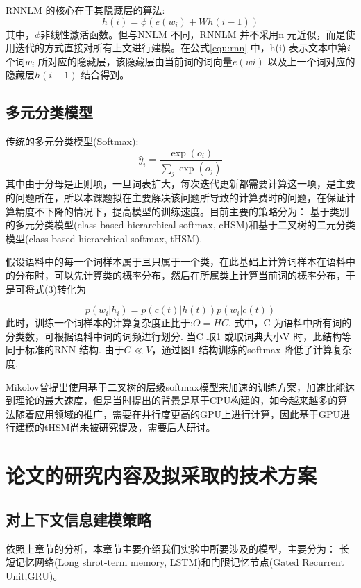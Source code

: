 \documentclass[12pt,a4paper]{article}
\begin{document}
RNNLM 的核心在于其隐藏层的算法:
\begin{equation}
\label{equ:rnn}
h(i) =\phi(e(w_i) +Wh(i -1))
\end{equation}
其中，$\phi$非线性激活函数。但与NNLM 不同，RNNLM 并不采用n 元近似，而是使用迭代的方式直接对所有上文进行建模。在公式\ref{equ:rnn} 中，h(i) 表示文本中第$i$ 个词$w_i$ 所对应的隐藏层，该隐藏层由当前词的词向量$e(wi)$ 以及上一个词对应的隐藏层$h(i -1)$ 结合得到。

\subsection{多元分类模型}
传统的多元分类模型(Softmax):
\begin{equation}\label{equ:softmax}
  \hat y_i=\frac{\exp(o_i)}{\sum_j \exp(o_j)}
\end{equation}
其中由于分母是正则项，一旦词表扩大，每次迭代更新都需要计算这一项，是主要的问题所在，所以本课题拟在主要解决该问题所导致的计算费时的问题，在保证计算精度不下降的情况下，提高模型的训练速度。目前主要的策略分为： 基于类别的多元分类模型(class-based hierarchical softmax, cHSM)和基于二叉树的二元分类模型(class-based hierarchical softmax, tHSM).

假设语料中的每一个词样本属于且只属于一个类，在此基础上计算词样本在语料中的分布时，可以先计算类的概率分布，然后在所属类上计算当前词的概率分布，于是可将式(3)转化为

\begin{equation}\label{equ:class}
  p(w_i|h_i) = p(c(t)|h(t))p(w_i|c(t)) 
\end{equation}
此时，训练一个词样本的计算复杂度正比于:$O =HC$. 式中，C 为语料中所有词的分类数，可根据语料中词的词频进行划分. 当C 取1 或取词典大小V 时，此结构等同于标准的RNN 结构. 由于$C \ll V$，通过图1 结构训练的softmax 降低了计算复杂度.

Mikolov曾提出使用基于二叉树的层级softmax模型来加速的训练方案，加速比能达到理论的最大速度，但是当时提出的背景是基于CPU构建的，如今越来越多的算法随着应用领域的推广，需要在并行度更高的GPU上进行计算，因此基于GPU进行建模的tHSM尚未被研究提及，需要后人研讨。


\section{论文的研究内容及拟采取的技术方案}
\subsection{对上下文信息建模策略}
依照上章节的分析，本章节主要介绍我们实验中所要涉及的模型，主要分为： 长短记忆网络(Long shrot-term memory, LSTM)和门限记忆节点(Gated Recurrent Unit,GRU)。
\end{document}
